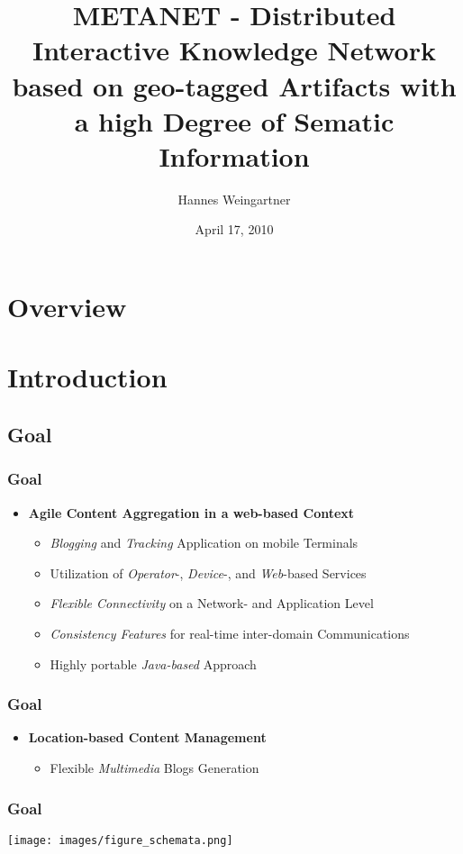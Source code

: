 \documentclass[blue]{beamer}
\title{METANET - Distributed Interactive Knowledge Network based on geo-tagged Artifacts with a high Degree of Sematic Information}
\institute[META-D.O.N]{META-D.O.N\\Association for Cultural Substitution Services}
\author{Hannes Weingartner}
\date{April 17, 2010}
\begin{document}
\frame{\titlepage}

\section*{Overview}
\frame{\tableofcontents}




\section{Introduction}
\subsection{Goal}
\frame
{
\frametitle{\textbf{Goal}}
\begin{itemize}
\item \textbf{Agile Content Aggregation in a web-based Context}
  \begin{itemize}
    \item \textit{Blogging} and \textit{Tracking} Application on mobile Terminals
    \item Utilization of \textit{Operator}-, \textit{Device}-, and \textit{Web}-based Services
    \item \textit{Flexible Connectivity} on a Network- and Application Level
    \item \textit{Consistency Features} for real-time inter-domain Communications
    \item Highly portable \textit{Java-based} Approach
  \end{itemize}
\end{itemize}
}

\frame
{
\frametitle{\textbf{Goal}}
\begin{itemize}
\item \textbf{Location-based Content Management}
  \begin{itemize}
    \item Flexible \textit{Multimedia} Blogs Generation
  \end{itemize}
\end{itemize}
}

\frame
{
\frametitle{\textbf{Goal}}
\texttt{[image: images/figure\_schemata.png]}
}


\end{document}
